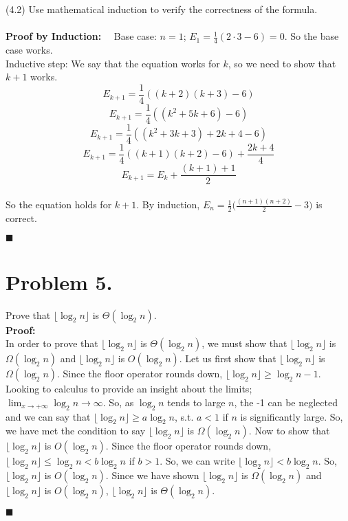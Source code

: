 \documentclass[11pt]{article}
\begin{document}
\noindent
(4.2) Use mathematical induction to verify the correctness of the formula.\\\\
\noindent
{\bf Proof by Induction:}~~ 
\newline
Base case: $n=1$; $E_1 = \frac{1}{4}(2\cdot3 - 6) = 0$. So the base case works.\\
Inductive step: We say that the equation works for $k$, so we need to show that $k+1$ works.\\
\[E_{k+1} = \frac{1}{4}((k+2)(k+3)-6)\]
\[E_{k+1} = \frac{1}{4}((k^2+5k+6)-6)\]
\[E_{k+1} = \frac{1}{4}((k^2+3k+3)+2k+4-6)\]
\[E_{k+1} = \frac{1}{4}((k+1)(k+2)-6) +\frac{2k+4}{4}\]
\[E_{k+1} = E_{k} + \frac{(k+1)+1}{2}\]\\
So the equation holds for $k+1$. By induction, $E_n = \frac{1}{2}\Big(\frac{(n+1)(n+2)}{2}-3\Big)$ is correct.
\begin{flushright}$\blacksquare$\end{flushright}

\newpage


\section*{Problem 5.}

Prove that $\lfloor\log_2n\rfloor$ is $\Theta(\log_2n)$.\\

\noindent
{\bf Proof:}~~\\
In order to prove that $\lfloor\log_2n\rfloor$ is $\Theta(\log_2n)$, we must show that $\lfloor\log_2n\rfloor$ is $\Omega(\log_2n)$ and $\lfloor\log_2n\rfloor$ is $O(\log_2n)$. Let us first show that $\lfloor\log_2n\rfloor$ is $\Omega(\log_2n)$. Since the floor operator rounds down, $\lfloor \log_2n \rfloor \geq \log_2n -1$. Looking to calculus to provide an insight about the limits; $\lim_{x \to +\infty} \log_2n \rightarrow \infty$. So, as $\log_2n$ tends to large $n$, the -1 can be neglected and we can say that $\lfloor \log_2n \rfloor \geq a\log_2n$, s.t. $a<1$ if $n$ is significantly large. So, we have met the condition to say $\lfloor\log_2n\rfloor$ is $\Omega(\log_2n)$. Now to show that $\lfloor\log_2n\rfloor$ is $O(\log_2n)$. Since the floor operator rounds down, $\lfloor \log_2n \rfloor \leq \log_2n < b\log_2n$ if $b>1$. So, we can write $\lfloor \log_2n \rfloor < b\log_2n$. So, $\lfloor\log_2n\rfloor$ is $O(\log_2n)$. Since we have shown $\lfloor\log_2n\rfloor$ is $\Omega(\log_2n)$ and $\lfloor\log_2n\rfloor$ is $O(\log_2n)$, $\lfloor\log_2n\rfloor$ is $\Theta(\log_2n)$.
\begin{flushright}$\blacksquare$\end{flushright}
\end{document}
